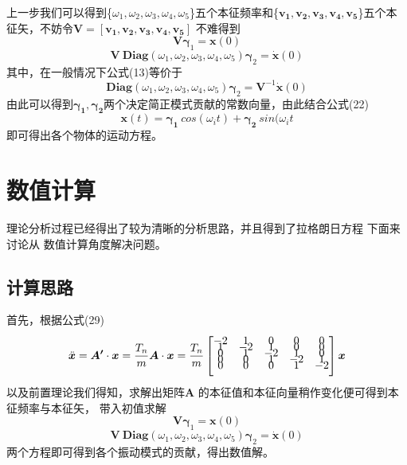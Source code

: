 \documentclass[11pt, a4paper, oneside]{ctexart}
\begin{document}
{上一步我们可以得到\{$\omega_1,\omega_2,\omega_3,\omega_4,\omega_5$\}五个本征频率和\{$\boldsymbol{v_1,v_2,v_3,v_4,v_5}$\}五个本征矢，不妨令$\boldsymbol {V}=[\boldsymbol{v_1,v_2,v_3,v_4,v_5}]$
不难得到
\begin{equation}
    \boldsymbol {V} \boldsymbol\gamma_1 = \boldsymbol x(0)
\end{equation}
\begin{equation}
    \boldsymbol {V}\  \boldsymbol {Diag}(\omega_1,\omega_2,\omega_3,\omega_4,\omega_5)\boldsymbol\gamma_2 = \boldsymbol{\dot x}(0) 
\end{equation}
其中，在一般情况下公式(13)等价于
\begin{equation}
    \boldsymbol {Diag}(\omega_1,\omega_2,\omega_3,\omega_4,\omega_5)\boldsymbol\gamma_2 = \boldsymbol {V}^{-1} \boldsymbol{\dot x}(0) 
\end{equation}
由此可以得到$\boldsymbol{\gamma_1,\gamma_2}$两个决定简正模式贡献的常数向量，由此结合公式(22)
$$
    \bm x(t)=\bm{\gamma_{1}}\ cos(\omega_it)+\bm{\gamma_{2}}\ sin(\omega_it
$$
即可得出各个物体的运动方程。

\newpage
\section{数值计算}
{
    理论分析过程已经得出了较为清晰的分析思路，并且得到了拉格朗日方程
    下面来讨论从
    数值计算角度解决问题。


}
\subsection{计算思路}
{
    首先，根据公式(29)
    $$
        \ddot{\boldsymbol{x}}=\boldsymbol{A'} \cdot \boldsymbol{x}=\frac{T_n}{m}\boldsymbol{A} \cdot \boldsymbol{x}=\frac{T_n}{m}\left
        [\begin{matrix}\vspace{-1.5ex}
        -2 & 1 & 0 & 0 & 0 \\\vspace{-1.5ex} 
        1 & -2 & 1 & 0 & 0 \\\vspace{-1.5ex} 
        0 & 1 & -2 & 1 & 0 \\\vspace{-1.5ex} 
        0 & 0 & 1 & -2 & 1 \\\vspace{-1.5ex} 
        0 & 0 & 0 & 1 & -2\vspace{2.5ex} 
        \end{matrix}\right] \boldsymbol{x}
    $$
以及前置理论我们得知，求解出矩阵$\boldsymbol A$
的本征值和本征向量稍作变化便可得到本征频率与本征矢，
带入初值求解
$$
    \boldsymbol {V} \boldsymbol\gamma_1 = \boldsymbol x(0)
$$$$
    \boldsymbol {V}\  \boldsymbol{Diag}(\omega_1,\omega_2,\omega_3,\omega_4,\omega_5)\boldsymbol\gamma_2 = \boldsymbol{\dot x}(0) 
$$
两个方程即可得到各个振动模式的贡献，得出数值解。

}}
\end{document}
